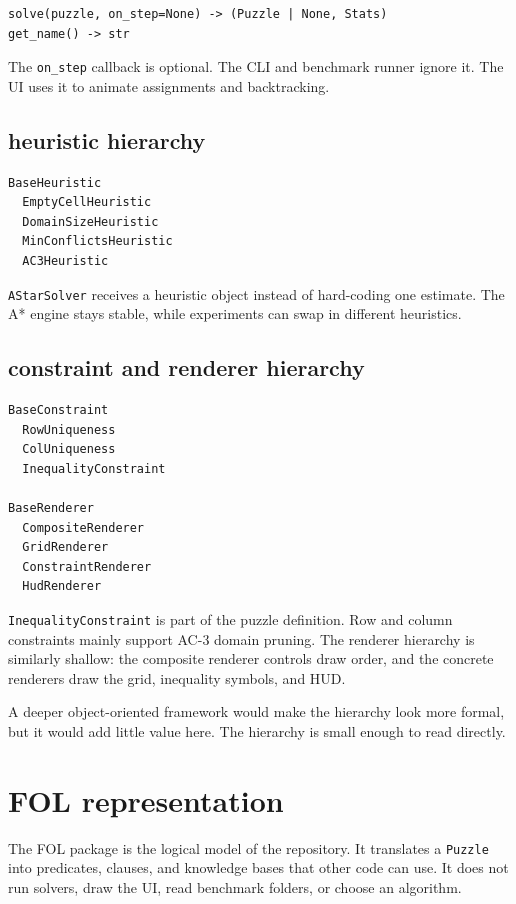 \documentclass[11pt]{article}
\begin{document}
\begin{verbatim}
solve(puzzle, on_step=None) -> (Puzzle | None, Stats)
get_name() -> str
\end{verbatim}

The \texttt{on\_step} callback is optional. The CLI and benchmark runner ignore
it. The UI uses it to animate assignments and backtracking.

\subsection{heuristic hierarchy}

\begin{verbatim}
BaseHeuristic
  EmptyCellHeuristic
  DomainSizeHeuristic
  MinConflictsHeuristic
  AC3Heuristic
\end{verbatim}

\texttt{AStarSolver} receives a heuristic object instead of hard-coding one
estimate. The A* engine stays stable, while experiments can swap in different
heuristics.

\subsection{constraint and renderer hierarchy}

\begin{verbatim}
BaseConstraint
  RowUniqueness
  ColUniqueness
  InequalityConstraint

BaseRenderer
  CompositeRenderer
  GridRenderer
  ConstraintRenderer
  HudRenderer
\end{verbatim}

\texttt{InequalityConstraint} is part of the puzzle definition. Row and column
constraints mainly support AC-3 domain pruning. The renderer hierarchy is
similarly shallow: the composite renderer controls draw order, and the concrete
renderers draw the grid, inequality symbols, and HUD.

A deeper object-oriented framework would make the hierarchy look more formal,
but it would add little value here. The hierarchy is small enough to read
directly.

\section{FOL representation}

The FOL package is the logical model of the repository. It translates a
\texttt{Puzzle} into predicates, clauses, and knowledge bases that other code
can use. It does not run solvers, draw the UI, read benchmark folders, or choose
an algorithm.
\end{document}

